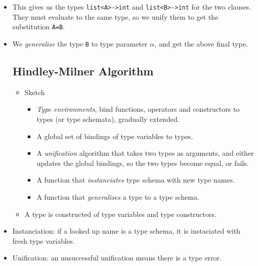 \begin{itemize}
\item This gives us the types \texttt{list<A>->int} and \texttt{list<B>->int}
for the two clauses. They must evaluate to the same type, so we unify them to
get the substitution \texttt{A=B}.

\item We \emph{generalise} the type \texttt{B} to type parameter $\alpha$, and
get the above final type.

\subsection{Hindley-Milner Algorithm}

\begin{itemize}

\item Sketch 

\begin{itemize}

\item \emph{Type environments}, bind functions, operators and constructors to
types (or type schemata), gradually extended.

\item A global set of bindings of type variables to types.

\item A \emph{unification} algorithm that takes two types as arguments, and
either updates the global bindings, so the two types become equal, or fails.

\item A function that \emph{instanciates} type schema with new type names.

\item A function that \emph{generalises} a type to a type schema.

\end{itemize}

\item A type is constructed of type variables and type constructors.

\end{itemize}

\item Instanciation: if a looked up name is a type schema, it is instaciated
with fresh type variables.

\item Unification: an unsuccessful unification means there is a type error.

\begin{itemize}


\end{itemize}
\end{itemize}
